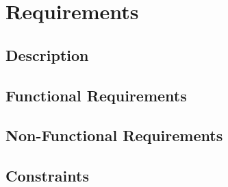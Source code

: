 \chapter{Requirements}

\section{Description}

\section{Functional Requirements}

\section{Non-Functional Requirements}

\section{Constraints}